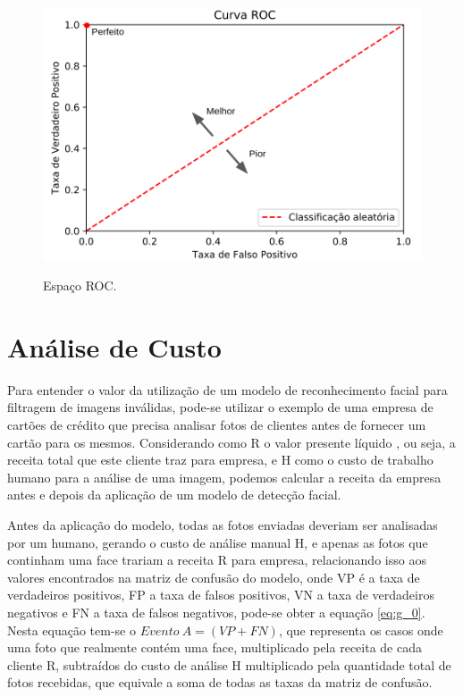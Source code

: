 \begin{figure}[htbp]
    \centering
    \caption{Espaço ROC.}
    \includegraphics[scale=.4]{figs/curva_roc.png}
    \label{fig:roc_space}
\end{figure}

\section{Análise de Custo}

Para entender o valor da utilização de um modelo de reconhecimento facial para filtragem de imagens inválidas, pode-se utilizar o exemplo de uma empresa de cartões de crédito que precisa analisar fotos de clientes antes de fornecer um cartão para os mesmos. Considerando como R o valor presente líquido \cite{npv-article}, ou seja, a receita total que este cliente traz para empresa, e H como o custo de trabalho humano para a análise de uma imagem, podemos calcular a receita da empresa antes e depois da aplicação de um modelo de detecção facial.

Antes da aplicação do modelo, todas as fotos enviadas deveriam ser analisadas por um humano, gerando o custo de análise manual H, e apenas as fotos que continham uma face trariam a receita R para empresa, relacionando isso aos valores encontrados na matriz de confusão do modelo, onde VP é a taxa de verdadeiros positivos, FP a taxa de falsos positivos, VN a taxa de verdadeiros negativos e FN a taxa de falsos negativos, pode-se obter a equação \ref{eq:g_0}. Nesta equação tem-se o $Evento\:A = (VP + FN)$, que representa os casos onde uma foto que realmente contém uma face, multiplicado pela receita de cada cliente R, subtraídos do custo de análise H multiplicado pela quantidade total de fotos recebidas, que equivale a soma de todas as taxas da matriz de confusão.

